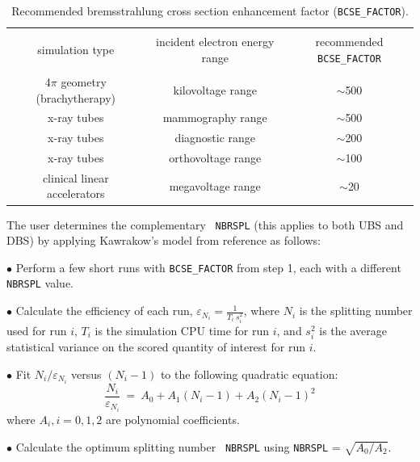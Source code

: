 \documentclass[12pt,twoside]{article}
\begin{document}
\vspace{0.3cm}
\begin{table}[h]
\caption{Recommended bremsstrahlung cross section enhancement factor
({\tt BCSE\_FACTOR}). \label{table_optima}}
\vspace{-0.5cm}
\begin{center}
\begin{tabular}{|c|c|c|}
\hline
 & & \\
simulation type & incident electron energy range & recommended {\tt BCSE\_FACTOR} \\
 & & \\ \hline
 4$\pi$ geometry (brachytherapy) & kilovoltage range & $\sim$500 \\
x-ray tubes & mammography range & $\sim$500 \\
x-ray tubes & diagnostic range & $\sim$200 \\
x-ray tubes & orthovoltage range & $\sim$100 \\
clinical linear accelerators & megavoltage range & $\sim$20 \\
\hline
\end{tabular}
\end{center}
\end{table}
\vspace{0.3cm}

 The user determines the complementary {\tt
NBRSPL} (this applies to both UBS and DBS) by applying Kawrakow's
model from reference\cite{MK06} as follows:

\noindent $\bullet$ Perform a few short runs with {\tt BCSE\_FACTOR}
from step 1, each with a different {\tt NBRSPL} value.

\noindent $\bullet$ Calculate the efficiency of each run,
$\varepsilon_{N_{i}} = \frac{1}{T_{i}~s_{i}^{2}}$, where $N_{i}$ is
the splitting number used for run $i$, $T_{i}$ is the simulation CPU
time for run $i$, and $s_{i}^{2}$ is the average statistical variance
on the scored quantity of interest for run $i$.

\noindent $\bullet$ Fit $N_{i}/\varepsilon_{N_{i}}$ versus
$(N_{i}-1)$ to the following quadratic equation:
\begin{equation}
\frac{N_{i}}{\varepsilon_{N_{i}}}~=~A_{0}+A_{1}(N_{i}-1)+A_{2}(N_{i}-1)^{2}
\end{equation}
where $A_{i}, i=0,1,2$ are polynomial coefficients.

\noindent $\bullet$ Calculate the optimum splitting number {\tt
NBRSPL} using {\tt NBRSPL} = $\sqrt{A_{0}/A_{2}}$.
\end{document}
